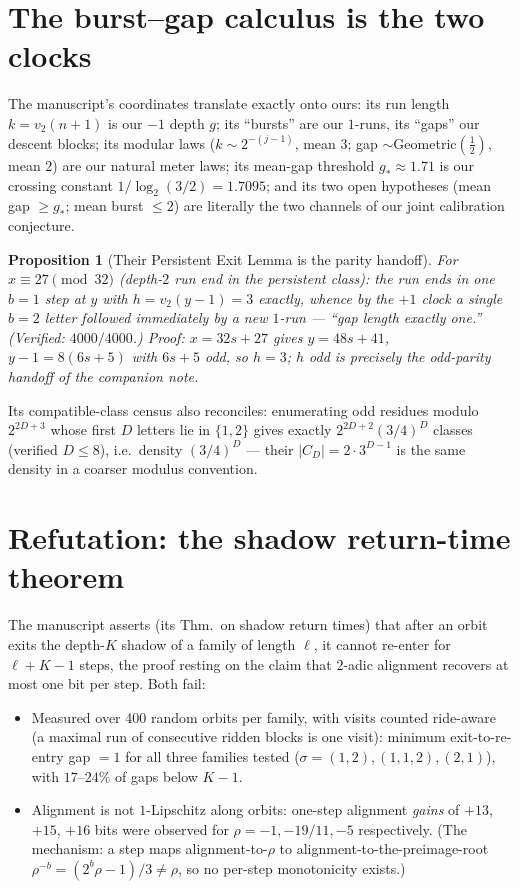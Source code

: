 \documentclass[11pt]{article}
\newtheorem{proposition}{Proposition}
\newcommand{\vt}{v_2}
\begin{document}
\section{The burst--gap calculus is the two clocks}

The manuscript's coordinates translate exactly onto ours: its run
length $k=\vt(n+1)$ is our $-1$ depth $g$; its ``bursts'' are our
$1$-runs, its ``gaps'' our descent blocks; its modular laws
($k\sim2^{-(j-1)}$, mean $3$; gap $\sim$Geometric$(\tfrac12)$, mean
$2$) are our natural meter laws; its mean-gap threshold
$g_*\approx1.71$ is our crossing constant $1/\log_2(3/2)=1.7095$; and
its two open hypotheses (mean gap $\ge g_*$; mean burst $\le2$) are
literally the two channels of our joint calibration conjecture.

\begin{proposition}[Their Persistent Exit Lemma is the parity
handoff]\label{prop:pel}
For $x\equiv27\pmod{32}$ (depth-$2$ run end in the persistent class):
the run ends in one $b{=}1$ step at $y$ with $h=\vt(y-1)=3$
\emph{exactly}, whence by the $+1$ clock a single $b{=}2$ letter
followed immediately by a new $1$-run --- ``gap length exactly one.''
(Verified: $4000/4000$.) Proof: $x=32s+27$ gives
$y=48s+41$, $y-1=8(6s+5)$ with $6s+5$ odd, so $h=3$; $h$ odd is
precisely the odd-parity handoff of the companion note.
\end{proposition}

Its compatible-class census also reconciles: enumerating odd residues
modulo $2^{2D+3}$ whose first $D$ letters lie in $\{1,2\}$ gives
exactly $2^{2D+2}(3/4)^D$ classes (verified $D\le8$), i.e.\ density
$(3/4)^D$ --- their $|C_D|=2\cdot3^{D-1}$ is the same density in a
coarser modulus convention.

\section{Refutation: the shadow return-time theorem}

The manuscript asserts (its Thm.~on shadow return times) that after an
orbit exits the depth-$K$ shadow of a family of length $\ell$, it
cannot re-enter for $\ell+K-1$ steps, the proof resting on the claim
that $2$-adic alignment recovers at most one bit per step. Both fail:

\begin{itemize}
\item Measured over $400$ random orbits per family, with visits
counted ride-aware (a maximal run of consecutive ridden blocks is one
visit): minimum exit-to-re-entry gap $=1$ for all three families
tested ($\sigma=(1,2),(1,1,2),(2,1)$), with $17$--$24\%$ of gaps below
$K-1$.
\item Alignment is not $1$-Lipschitz along orbits: one-step alignment
\emph{gains} of $+13$, $+15$, $+16$ bits were observed for
$\rho=-1,-19/11,-5$ respectively. (The mechanism: a step maps
alignment-to-$\rho$ to alignment-to-the-preimage-root
$\rho^{-b}=(2^b\rho-1)/3\ne\rho$, so no per-step monotonicity
exists.)
\end{itemize}
\end{document}
